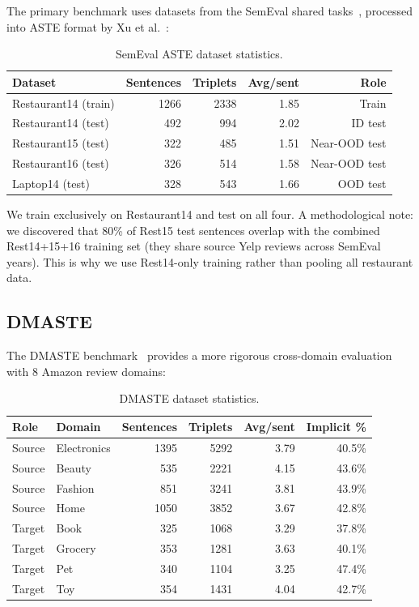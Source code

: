 \documentclass[12pt,a4paper]{report}
\begin{document}
The primary benchmark uses datasets from the SemEval shared tasks~\cite{pontiki2014semeval, pontiki2015semeval, pontiki2016semeval}, processed into ASTE format by Xu et al.~\cite{xu2020position}:

\begin{table}[htbp]
\centering
\caption{SemEval ASTE dataset statistics.}
\small
\begin{tabular}{@{}lrrrr@{}}
\toprule
\textbf{Dataset} & \textbf{Sentences} & \textbf{Triplets} & \textbf{Avg/sent} & \textbf{Role} \\
\midrule
Restaurant14 (train) & 1266 & 2338 & 1.85 & Train \\
Restaurant14 (test) & 492 & 994 & 2.02 & ID test \\
Restaurant15 (test) & 322 & 485 & 1.51 & Near-OOD test \\
Restaurant16 (test) & 326 & 514 & 1.58 & Near-OOD test \\
Laptop14 (test) & 328 & 543 & 1.66 & OOD test \\
\bottomrule
\end{tabular}
\end{table}

We train exclusively on Restaurant14 and test on all four. A methodological note: we discovered that 80\% of Rest15 test sentences overlap with the combined Rest14+15+16 training set (they share source Yelp reviews across SemEval years). This is why we use Rest14-only training rather than pooling all restaurant data.

\subsection{DMASTE}

The DMASTE benchmark~\cite{xu2023dmaste} provides a more rigorous cross-domain evaluation with 8 Amazon review domains:

\begin{table}[htbp]
\centering
\caption{DMASTE dataset statistics.}
\small
\begin{tabular}{@{}llrrrr@{}}
\toprule
\textbf{Role} & \textbf{Domain} & \textbf{Sentences} & \textbf{Triplets} & \textbf{Avg/sent} & \textbf{Implicit \%} \\
\midrule
Source & Electronics & 1395 & 5292 & 3.79 & 40.5\% \\
Source & Beauty & 535 & 2221 & 4.15 & 43.6\% \\
Source & Fashion & 851 & 3241 & 3.81 & 43.9\% \\
Source & Home & 1050 & 3852 & 3.67 & 42.8\% \\
\midrule
Target & Book & 325 & 1068 & 3.29 & 37.8\% \\
Target & Grocery & 353 & 1281 & 3.63 & 40.1\% \\
Target & Pet & 340 & 1104 & 3.25 & 47.4\% \\
Target & Toy & 354 & 1431 & 4.04 & 42.7\% \\
\bottomrule
\end{tabular}
\end{table}
\end{document}
